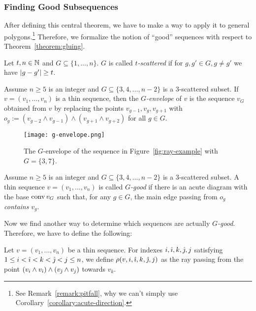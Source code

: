 \subsubsection{Finding Good Subsequences}

After defining this central theorem, we have to make a way to apply it to general polygons.\footnote{See Remark~\ref{remark:pitfall}, why we can't simply use Corollary~\ref{corollary:acute-direction}.}
Therefore, we formalize the notion of ``good'' sequences with respect to Theorem~\ref{theorem:gluing}.

\begin{definition}
  Let $t, n \in \mathbb{N}$ and $G \subseteq \{1,\dots,n\}$. $G$ is called \emph{$t$-scattered} if for $g, g' \in G, g \neq g'$ we have $\lvert g-g'\rvert \geq t$.
\end{definition}

\begin{definition}[$G$-envelope]\label{definition:g-envelope}
  Assume $n\geq 5$ is an integer and $G\subseteq\{3,4,\dots,n-2\}$ is a $3$-scattered subset. If $v=(v_1,\dots,v_n)$ is a thin sequence, then the \emph{$G$-envelope} of $v$ is the sequence $v_G$ obtained from $v$ by replacing the points $v_{g-1}, v_g, v_{g+1}$ with $o_g:=(v_{g-2}\wedge v_{g-1})\wedge (v_{g+1}\wedge v_{g+2})$ for all $g\in G$.
\end{definition}

\begin{figure}[ht]
  \centering
  \texttt{[image: g-envelope.png]}
  \caption{The $G$-envelope of the sequence in Figure~\ref{fig:ray-example} with $G=\{3,7\}$. \cite[Figure~6]{shitov2020sublinear}}
  \label{fig:g-envelope}
\end{figure}

\begin{definition}[G-good]
  Assume $n\geq 5$ is an integer and $G\subseteq\{3,4,\dots,n-2\}$ is a $3$-scattered subset. A thin sequence $v=(v_1,\dots,v_n)$ is called \emph{$G$-good} if there is an acute diagram with the base $\operatorname{conv} v_G$ such that, for any $g\in G$, the main edge passing from $o_g$ \emph{contains} $v_g$.
\end{definition}

Now we find another way to determine which sequences are actually \emph{$G$-good}. Therefore, we have to define the following:

\begin{definition}
  Let $v=(v_1,\dots,v_n)$ be a thin sequence. For indexes $i,\mathcal{\hat{\imath}},k, \mathcal{\hat{\jmath}}, j$ satisfying $1\leq i<\mathcal{\hat{\imath}}<k<\mathcal{\hat{\jmath}}<j\leq n$, we define $\rho(v,i,\mathcal{\hat{\imath}},k, \mathcal{\hat{\jmath}}, j)$ as the ray passing from the point $(v_i\wedge v_{\mathcal{\hat{\imath}}})\wedge(v_{\mathcal{\hat{\jmath}}}\wedge v_j)$ towards $v_k$.
\end{definition}

